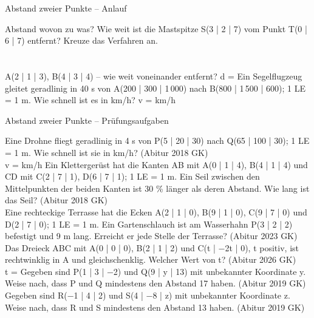 \setcounter{aufgabe}{64}

\begin{aufgabe}{Abstand zweier Punkte – Anlauf}
\begin{teile}
\teil Abstand wovon zu was? Wie weit ist die Mastspitze S(3 | 2 | 7) vom Punkt T(0 | 6 | 7) entfernt? Kreuze das Verfahren an. \\  \\  \\ 
\teil A(2 | 1 | 3), B(4 | 3 | 4) – wie weit voneinander entfernt? d = \leerfeld
\teil Ein Segelflugzeug gleitet geradlinig in 40 s von A(200 | 300 | 1\,000) nach B(800 | 1\,500 | 600); 1 LE = 1 m. Wie schnell ist es in km/h? v = \leerfeld km/h
\end{teile}
\end{aufgabe}

\begin{aufgabe}{Abstand zweier Punkte – Prüfungsaufgaben}
\begin{teile}
\teil Eine Drohne fliegt geradlinig in 4 s von P(5 | 20 | 30) nach Q(65 | 100 | 30); 1 LE = 1 m. Wie schnell ist sie in km/h? \hfill (Abitur 2018 GK) \\ v = \leerfeld km/h
\teil Ein Klettergerüst hat die Kanten AB mit A(0 | 1 | 4), B(4 | 1 | 4) und CD mit C(2 | 7 | 1), D(6 | 7 | 1); 1 LE = 1 m. Ein Seil zwischen den Mittelpunkten der beiden Kanten ist 30 \% länger als deren Abstand. Wie lang ist das Seil? \hfill (Abitur 2018 GK) \\ \leerfeld[m]
\teil Eine rechteckige Terrasse hat die Ecken A(2 | 1 | 0), B(9 | 1 | 0), C(9 | 7 | 0) und D(2 | 7 | 0); 1 LE = 1 m. Ein Gartenschlauch ist am Wasserhahn P(3 | 2 | 2) befestigt und 9 m lang. Erreicht er jede Stelle der Terrasse? \hfill (Abitur 2023 GK) \\ \janein
\teil Das Dreieck ABC mit A(0 | 0 | 0), B(2 | 1 | 2) und C(t | −2t | 0), t positiv, ist rechtwinklig in A und gleichschenklig. Welcher Wert von t? \hfill (Abitur 2026 GK) \\ t = \leerfeld
\teil Gegeben sind P(1 | 3 | −2) und Q(9 | y | 13) mit unbekannter Koordinate y. Weise nach, dass P und Q mindestens den Abstand 17 haben. \hfill (Abitur 2019 GK)
\teil Gegeben sind R(−1 | 4 | 2) und S(4 | −8 | z) mit unbekannter Koordinate z. Weise nach, dass R und S mindestens den Abstand 13 haben. \hfill (Abitur 2019 GK)
\end{teile}
\end{aufgabe}

